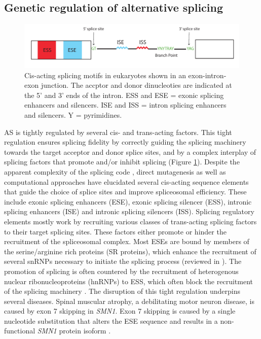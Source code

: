 \subsection{Genetic regulation of alternative splicing}
\begin{figure}[H]
    \centering
    \includegraphics[width=\textwidth]{splicing_motifs}
    \caption[Cis-acting splicing motifs in eukaryotes]{Cis-acting splicing motifs in eukaryotes shown in an exon-intron-exon junction. The accptor and donor dinucleoties are indicated at the 5' and 3' ends of the intron. ESS and ESE = exonic splicing enhancers and silencers. ISE and ISS = intron splicing enhancers and silencers. Y = pyrimidines.}
    \label{fig:splicing_motifs}   
  \end{figure}
AS is tightly regulated by several cis- and trans-acting factors. This tight regulation ensures splicing fidelity by correctly guiding the splicing machinery towards the target acceptor and donor splice sites, and by a complex interplay of splicing factors that promote and/or inhibit splicing (Figure \ref{fig:splicing_motifs}). Despite the apparent complexity of the splicing code \cite{Jaganathan2019-ah}, direct mutagenesis as well as computational approaches have elucidated several cis-acting sequence elements that guide the choice of splice sites and improve spliceosomal efficiency. These include exonic splicing enhancers (ESE), exonic splicing silencer (ESS), intronic splicing enhancers (ISE) and intronic splicing silencers (ISS). Splicing regulatory elements mostly work by recruiting various classes of trans-acting splicing factors to their target splicing sites. These factors either promote or hinder the recruitment of the spliceosomal complex. Most ESEs are bound by members of the serine/arginine rich proteins (SR proteins), which enhance the recruitment of several snRNPs necessary to initiate the splicing process (reviewed in \cite{Shepard2009-os}). The promotion of splicing is often countered by the recruitment of heterogenous nuclear ribonucleoproteins (hnRNPs) to ESS, which often block the recruitment of the splicing machinery \cite{Geuens2016-yz}. The disruption of this tight regulation underpins several diseases. Spinal muscular atrophy, a debilitating motor neuron disease, is caused by exon 7 skipping in \textit{SMN1}. Exon 7 skipping is caused by a single nucleotide substitution that alters the ESE sequence and results in a non-functional \textit{SMN1} protein isoform \cite{Monani1999-vf}.\\

